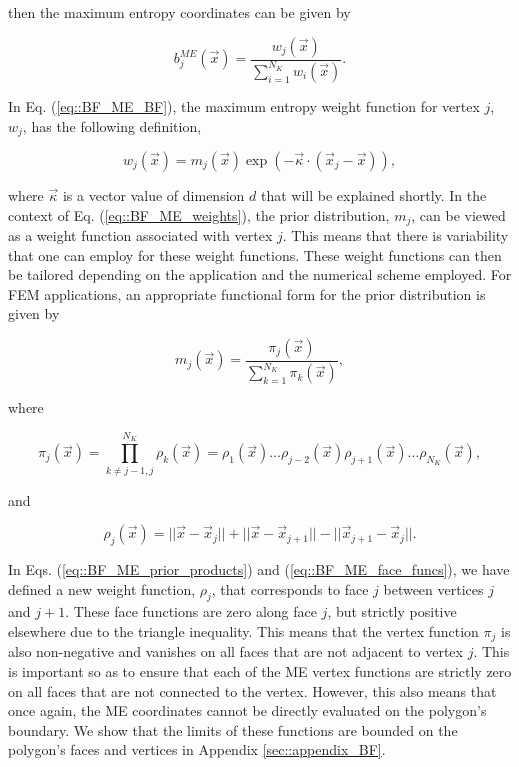 \noindent then the maximum entropy coordinates can be given by

\begin{equation}
\label{eq::BF_ME_BF}
b_{j}^{ME} (\vec{x}) = \frac{w_j (\vec{x}) }{\sum\limits_{i=1}^{N_K} w_i (\vec{x})} .
\end{equation}

\noindent In Eq. (\ref{eq::BF_ME_BF}), the maximum entropy weight function for vertex $j$, $w_j$, has the following definition,

\begin{equation}
\label{eq::BF_ME_weights}
w_j (\vec{x})  = m_j(\vec{x}) \exp(-  \vec{\kappa} \cdot (\vec{x}_j - \vec{x})),
\end{equation}

\noindent where $\vec{\kappa}$ is a vector value of dimension $d$ that will be explained shortly. In the context of Eq. (\ref{eq::BF_ME_weights}), the prior distribution, $m_j$, can be viewed as a weight function associated with vertex $j$. This means that there is variability that one can employ for these weight functions. These weight functions can then be tailored depending on the application and the numerical scheme employed. For FEM applications, an appropriate functional form for the prior distribution is given by

\begin{equation}
\label{eq::BF_ME_prior_funcs}
 m_j(\vec{x}) = \frac{\pi_j (\vec{x}) }{\sum\limits_{k=1}^{N_K} \pi_k (\vec{x})},
\end{equation}

\noindent where

\begin{equation}
\label{eq::BF_ME_prior_products}
\pi_j (\vec{x}) = \prod\limits_{k \neq j-1, j}^{N_K} \rho_k (\vec{x})  = \rho_1(\vec{x}) \ldots \rho_{j-2}(\vec{x}) \rho_{j+1}(\vec{x}) \ldots \rho_{N_K}(\vec{x}) ,
\end{equation}

\noindent and

\begin{equation}
\label{eq::BF_ME_face_funcs}
\rho_j (\vec{x}) = || \vec{x} - \vec{x}_j || + || \vec{x} - \vec{x}_{j+1} || - || \vec{x}_{j+1} - \vec{x}_j || .
\end{equation}

\noindent In Eqs. (\ref{eq::BF_ME_prior_products}) and (\ref{eq::BF_ME_face_funcs}), we have defined a new weight function, $\rho_j$, that corresponds to face $j$ between vertices $j$ and $j+1$. These face functions are zero along face $j$, but strictly positive elsewhere due to the triangle inequality. This means that the vertex function $\pi_j$ is also non-negative and vanishes on all faces that are not adjacent to vertex $j$. This is important so as to ensure that each of the ME vertex functions are strictly zero on all faces that are not connected to the vertex. However, this also means that once again, the ME coordinates cannot be directly evaluated on the polygon's boundary. We show that the limits of these functions are bounded on the polygon's faces and vertices in Appendix \ref{sec::appendix_BF}.

